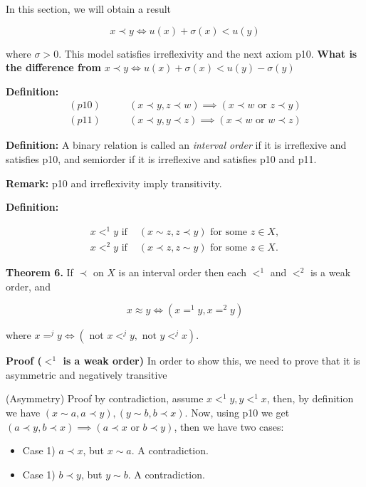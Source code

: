 \documentclass{article}
\theoremstyle{definition}
\def\tor{\text{ or }}
\def\tnot{\text{ not }}
\def\tif{\text{ if }}
\begin{document}
In this section, we will obtain a result

\begin{equation*}
x\prec y \iff u(x) + \sigma(x) < u(y)
\end{equation*}

where $\sigma > 0$. This model satisfies irreflexivity and the next axiom p10. {\bf What is the difference from} $x\prec y\iff u(x)+\sigma(x)<u(y)-\sigma(y)$

{\bf Definition:}
\begin{align}
(p10) &\qquad (x\prec y,z\prec w)\implies (x\prec w\tor z\prec y)\\
(p11) &\qquad (x\prec y,y\prec z)\implies (x\prec w\tor w\prec z)
\end{align}

{\bf Definition:} A binary relation is called an {\it interval order} if it is irreflexive and satisfies p10, and semiorder if it is irreflexive and satisfies p10 and p11.

{\bf Remark:} p10 and irreflexivity imply transitivity.

{\bf Definition:}

\begin{align*}
x<^1 y\tif & (x\sim z,z\prec y)\text{ for some }z\in X,\\
x <^2 y\tif & (x\prec z,z\sim y)\text{ for some }z\in X.
\end{align*}

{\bf Theorem 6.} If $\prec$ on $X$ is an interval order then each $<^1$ and $<^2$ is a weak order, and

\begin{equation*}
x\approx y\iff (x=^1y,x=^2y)
\end{equation*}

where $x=^j y\iff (\tnot x<^j y,\tnot y<^j x)$.

{\bf Proof ($<^1$ is a weak order)} In order to show this, we need to prove that it is asymmetric and negatively transitive

(Asymmetry) Proof by contradiction, assume $x<^1y,y<^1x$, then, by definition we have $(x\sim a,a\prec y),(y\sim b,b\prec x)$. Now, using p10 we get $(a\prec y,b\prec x)\implies (a\prec x\tor b\prec y)$, then we have two cases:

\begin{itemize}
\item[] Case 1) $a\prec x$, but $x\sim a$. A contradiction.
\item[] Case 1) $b\prec y$, but $y\sim b$. A contradiction.
\end{itemize}
\end{document}

